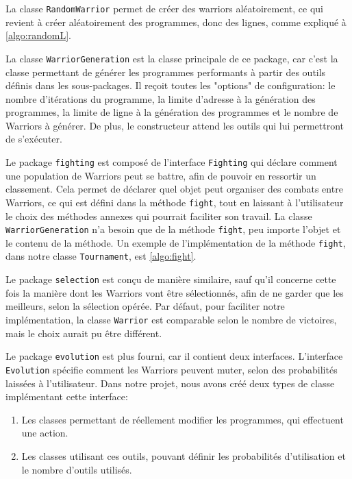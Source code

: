 \documentclass[hidelinks]{report}
\begin{document}
La classe \texttt{RandomWarrior} permet de créer des warriors aléatoirement, ce qui revient à créer aléatoirement des programmes, donc des lignes, comme expliqué à \autoref{algo:randomL}.

La classe \texttt{WarriorGeneration} est la classe principale de ce package, car c'est la classe permettant de générer les programmes performants à partir des outils définis dans les sous-packages. Il reçoit toutes les "options" de configuration: le nombre d'itérations du programme, la limite d'adresse à la génération des programmes, la limite de ligne à la génération des programmes et le nombre de Warriors à générer. De plus, le constructeur attend les outils qui lui permettront de s'exécuter.

Le package \texttt{fighting} est composé de l'interface \texttt{Fighting} qui déclare comment une population de Warriors peut se battre, afin de pouvoir en ressortir un classement. Cela permet de déclarer quel objet peut organiser des combats entre Warriors, ce qui est défini dans la méthode \texttt{fight}, tout en laissant à l'utilisateur le choix des méthodes annexes qui pourrait faciliter son travail. La classe \texttt{WarriorGeneration} n'a besoin que de la méthode \texttt{fight}, peu importe l'objet et le contenu de la méthode. Un exemple de l'implémentation de la méthode \texttt{fight}, dans notre classe \texttt{Tournament}, est \autoref{algo:fight}.

Le package \texttt{selection} est conçu de manière similaire, sauf qu'il concerne cette fois la manière dont les Warriors vont être sélectionnés, afin de ne garder que les meilleurs, selon la sélection opérée. Par défaut, pour faciliter notre implémentation, la classe \texttt{Warrior} est comparable selon le nombre de victoires, mais le choix aurait pu être différent.

Le package \texttt{evolution} est plus fourni, car il contient deux interfaces. L'interface \texttt{Evolution} spécifie comment les Warriors peuvent muter, selon des probabilités laissées à l'utilisateur. Dans notre projet, nous avons créé deux types de classe implémentant cette interface:
\begin{enumerate}
    \item Les classes permettant de réellement modifier les programmes, qui effectuent une action.
    \item Les classes utilisant ces outils, pouvant définir les probabilités d'utilisation et le nombre d'outils utilisés.
\end{enumerate}
\end{document}
